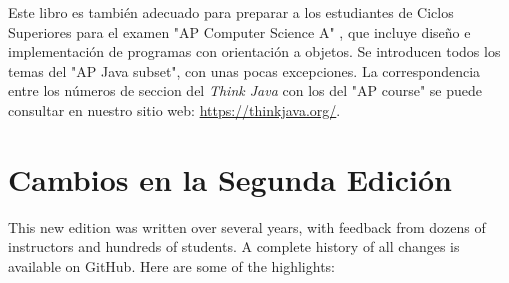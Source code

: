 Este libro es también adecuado para preparar a los estudiantes de Ciclos Superiores para el examen "AP Computer Science A" \footnotemark, que incluye diseño e implementación de programas con orientación a objetos.
Se introducen todos los temas del "AP Java subset", con unas pocas excepciones.
La correspondencia entre los números de seccion del {\it Think Java} con los del "AP course" se puede consultar en nuestro sitio web: \url{https://thinkjava.org/}.


\section*{Cambios en la Segunda Edición}

This new edition was written over several years, with feedback from dozens of instructors and hundreds of students.
A complete history of all changes is available on GitHub.
Here are some of the highlights:

